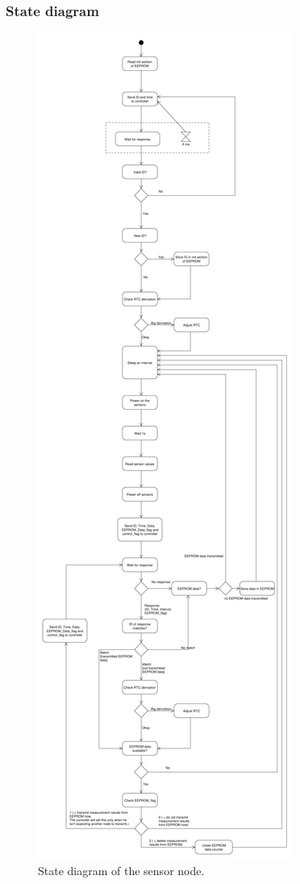 \subsubsection{State diagram}

\begin{figure}[h!]
	\begin{center}
	\includegraphics[scale=0.18]{images/SensorNode_0_4.pdf}
	\caption{State diagram of the sensor node.}
	\label{Setup_overview}
	\end{center}
\end{figure}
